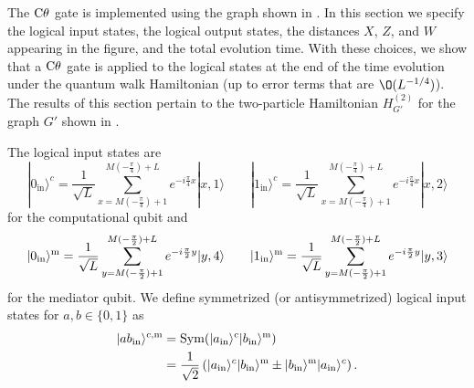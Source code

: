 \documentclass[../thesis-main/thesis-main]{subfiles}
\begin{document}
The $\mathrm{C}\theta$ gate is implemented using the graph shown in . In this section we specify the logical input states, the logical output states, the distances $X$, $Z$, and $W$ appearing in the figure, and the total evolution time. With these choices, we show that a $\mathrm{C}\theta$ gate is applied to the logical states at the end of the time evolution under the quantum walk Hamiltonian (up to error terms that are $\O(L^{-{1}/{4}})$). The results of this section pertain to the two-particle Hamiltonian $H^{(2)}_{G'}$ for the graph $G'$ shown in .

The logical input states are
\begin{equation*}
|0_{\text{in}}\rangle^c=\frac{1}{\sqrt{L}}\sum_{x=M(-\frac{\pi}{4})+1}^{M(-\frac{\pi}{4})+L}e^{-i\frac{\pi}{4}x}|x,1\rangle \qquad |1_\text{in}\rangle^c=\frac{1}{\sqrt{L}}\sum_{x=M(-\frac{\pi}{4})+1}^{M(-\frac{\pi}{4})+L}e^{-i\frac{\pi}{4}x}|x,2\rangle
\end{equation*}
for the computational qubit and
\begin{equation*}
|0_{\text{in}}\rangle^{\mathrm{m}}=\frac{1}{\sqrt{L}}\sum_{y=M(-\frac{\pi}{2})+1}^{M(-\frac{\pi}{2})+L}e^{-i\frac{\pi}{2}y}|y,4\rangle \qquad |1_\text{in}\rangle^{\mathrm{m}}=\frac{1}{\sqrt{L}}\sum_{y=M(-\frac{\pi}{2})+1}^{M(-\frac{\pi}{2})+L}e^{-i\frac{\pi}{2}y}|y,3\rangle
\end{equation*}
 for the mediator qubit. We define symmetrized (or antisymmetrized) logical input states for $a,b\in\{0,1\}$ as
\begin{align*}
|a b_{\text{in}}\rangle^{c,\mathrm{m}} &=\text{Sym}(|a_{\text{in}}\rangle^c |b_{\text{in}}\rangle^{\mathrm{m}} )\\
& =\frac{1}{\sqrt{2}} \left(|a_{\text{in}}\rangle^c |b_{\text{in}}\rangle^{\mathrm{m}} \pm |b_{\text{in}}\rangle^{\mathrm{m}}|a_{\text{in}}\rangle^c\right).
\end{align*}
\end{document}
